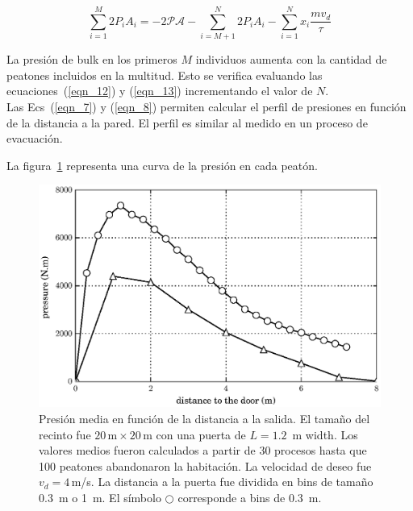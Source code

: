 \begin{equation}
 \displaystyle\sum_{i=1}^M 2P_iA_i 
=-2\mathcal{PA}-\displaystyle\sum_{i=M+1}^N 2P_iA_i-\displaystyle\sum_{i=1}^N 
x_i\displaystyle\frac{mv_d}{\tau}\label{eqn_13}
\end{equation}

La presión de bulk en los primeros $M$ individuos aumenta con la cantidad de peatones incluidos en la multitud. Esto se verifica evaluando las ecuaciones~(\ref{eqn_12}) y (\ref{eqn_13}) incrementando el valor de $N$.\\

Las Ecs~(\ref{eqn_7}) y (\ref{eqn_8}) permiten calcular el perfil de presiones en función de la distancia a la pared. El perfil es similar al medido en un proceso de evacuación.

La figura~\ref{fis_g} representa una curva de la presión en cada peatón. \\

\begin{figure}[H]
    \centering
    \includegraphics[scale=1]{figuras/p_dist.eps}
    \caption[width=5cm]{Presión media en función de la distancia a la salida. El tamaño del recinto fue $20\,\mathrm{m}\times20\,\mathrm{m}$  con una puerta de $L=1.2$~m width. Los valores medios fueron calculados a partir de 30 procesos hasta que 100 peatones abandonaron la habitación. La velocidad de deseo fue $v_d=4\,$m/s. La distancia a la puerta fue dividida en bins de tamaño $0.3$~m o 1~m.  El símbolo $\bigcirc$  corresponde a bins de $0.3$~m.}
    \label{fis_g}
\end{figure}



